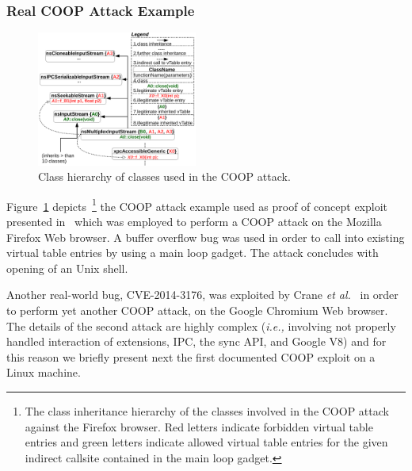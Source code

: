 \subsubsection{Real COOP Attack Example}
\label{Real COOP Attack Example}
\label{Running Example: CVE X}
\begin{figure}[h!]
    \centering
    \includegraphics[width=0.47\textwidth]{figures/class_hierarchy.pdf}
\caption{Class hierarchy of classes used in the COOP attack.}
\label{Class exploit}
\vspace{-.29cm}
\end{figure}
Figure~\ref{Class exploit} depicts~\footnote{The class inheritance hierarchy of the classes involved in the COOP attack against the Firefox browser. Red letters 
indicate forbidden virtual table entries and green letters indicate allowed virtual table entries for the given indirect callsite
contained in the main loop gadget.}
the COOP attack example used as proof of concept exploit presented in~\cite{schuster:coop} which was employed to 
perform a COOP attack on the Mozilla Firefox Web browser. A buffer overflow bug was used in order to call into existing virtual table 
entries by using a main loop gadget. The attack concludes with opening of an Unix shell. 

Another real-world bug, CVE-2014-3176, was exploited by Crane \textit{et al.}~\cite{crane:readactor++} in order to perform yet another 
COOP attack, on the Google Chromium Web browser. The details of the second attack are highly complex (\textit{i.e.,} involving not properly 
handled interaction of extensions, IPC, the sync API, and Google V8) and for this reason we briefly present next the first 
documented COOP exploit on a Linux machine.

